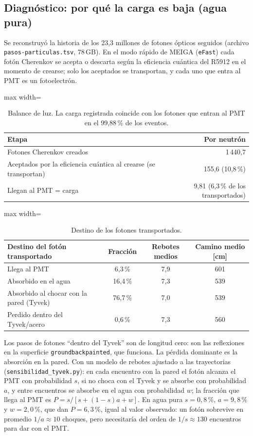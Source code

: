 \documentclass[11pt,a4paper]{article}
\begin{document}
\subsection{Diagnóstico: por qué la carga es baja (agua pura)}\label{sec:diag}
Se reconstruyó la historia de los 23,3 millones de fotones ópticos seguidos (archivo \texttt{pasos-particulas.tsv}, 78\,GB).
En el modo rápido de MEIGA (\texttt{eFast}) cada fotón Cherenkov se acepta o descarta según la eficiencia cuántica del R5912 en el momento de crearse;
solo los aceptados se transportan, y cada uno que entra al PMT es un fotoelectrón.
\begin{table}[H]\centering\small\begin{adjustbox}{max width=\linewidth}\begin{tabular}{lr}\toprule
Etapa & Por neutrón \\\midrule
Fotones Cherenkov creados & 1\,440,7 \\
Aceptados por la eficiencia cuántica al crearse (se transportan) & 155,6 (10,8\,\%) \\
Llegan al PMT = carga & 9,81 (6,3\,\% de los transportados) \\\bottomrule
\end{tabular}\end{adjustbox}\caption{Balance de luz. La carga registrada coincide con los fotones que entran al PMT en el 99,88\,\% de los eventos.}\end{table}
\begin{table}[H]\centering\small\begin{adjustbox}{max width=\linewidth}\begin{tabular}{lccc}\toprule
Destino del fotón transportado & Fracción & Rebotes medios & Camino medio [cm] \\\midrule
Llega al PMT & 6,3\,\% & 7,9 & 601 \\
Absorbido en el agua & 16,4\,\% & 7,3 & 539 \\
Absorbido al chocar con la pared (Tyvek) & 76,7\,\% & 7,0 & 539 \\
Perdido dentro del Tyvek/acero & 0,6\,\% & 7,3 & 560 \\
\bottomrule\end{tabular}\end{adjustbox}\caption{Destino de los fotones transportados.}\end{table}
Los pasos de fotones ``dentro del Tyvek'' son de longitud cero: son las reflexiones en la superficie \texttt{groundbackpainted}, que funciona.
La pérdida dominante es la absorción en la pared. Con un modelo de rebotes ajustado a las trayectorias (\texttt{sensibilidad\_tyvek.py}): en cada encuentro con la pared el fotón alcanza el PMT con probabilidad $s$, si no choca con el Tyvek y se absorbe con probabilidad $a$, y entre encuentros se absorbe en el agua con probabilidad $w$; la fracción que llega al PMT es $P = s/[s + (1-s)a + w]$.
En agua pura $s = 0{,}8$\,\%, $a = 9{,}8$\,\% y $w = 2{,}0$\,\%, que dan $P = 6{,}3$\,\%, igual al valor observado: un fotón sobrevive en promedio $1/a \approx 10$ choques, pero necesitaría del orden de $1/s \approx 130$ encuentros para dar con el PMT.
\end{document}
